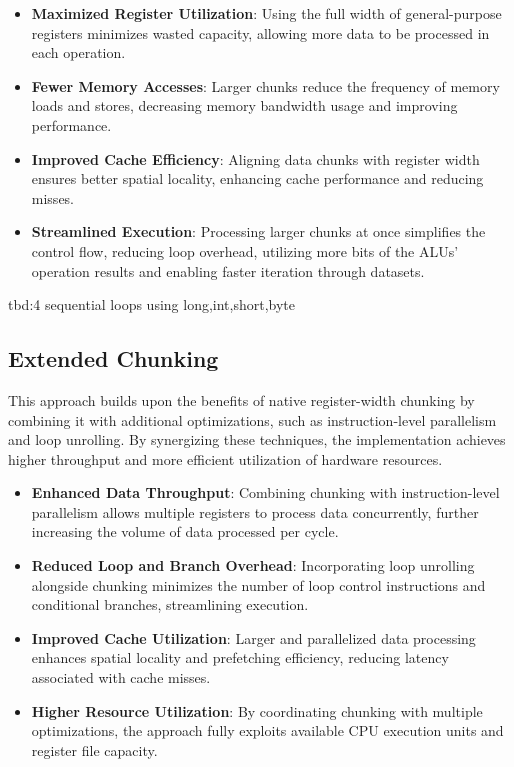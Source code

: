 \documentclass{article}
\begin{document}
\begin{itemize}
  \item \textbf{Maximized Register Utilization}: Using the full width of general-purpose registers minimizes wasted capacity, allowing more data to be processed in each operation.
  \item \textbf{Fewer Memory Accesses}: Larger chunks reduce the frequency of memory loads and stores, decreasing memory bandwidth usage and improving performance.
  \item \textbf{Improved Cache Efficiency}: Aligning data chunks with register width ensures better spatial locality, enhancing cache performance and reducing misses.
  \item \textbf{Streamlined Execution}: Processing larger chunks at once simplifies the control flow, reducing loop overhead, utilizing more bits of the ALUs' operation results and enabling faster iteration through datasets.
\end{itemize}

tbd:4 sequential loops using long,int,short,byte

\subsection{Extended Chunking}

This approach builds upon the benefits of native register-width chunking by combining it with additional optimizations, such as instruction-level parallelism and loop unrolling. By synergizing these techniques, the implementation achieves higher throughput and more efficient utilization of hardware resources.

\begin{itemize}
  \item \textbf{Enhanced Data Throughput}: Combining chunking with instruction-level parallelism allows multiple registers to process data concurrently, further increasing the volume of data processed per cycle.
  \item \textbf{Reduced Loop and Branch Overhead}: Incorporating loop unrolling alongside chunking minimizes the number of loop control instructions and conditional branches, streamlining execution.
  \item \textbf{Improved Cache Utilization}: Larger and parallelized data processing enhances spatial locality and prefetching efficiency, reducing latency associated with cache misses.
  \item \textbf{Higher Resource Utilization}: By coordinating chunking with multiple optimizations, the approach fully exploits available CPU execution units and register file capacity.
\end{itemize}
\end{document}
